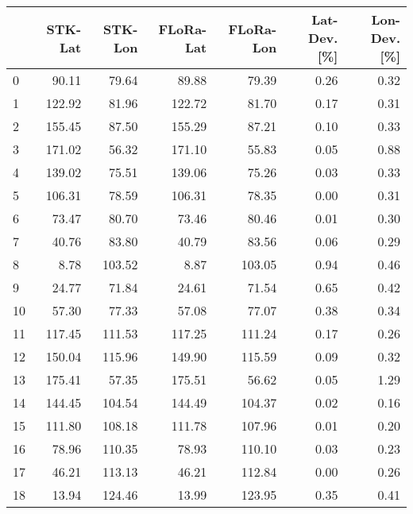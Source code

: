 \begin{tabular}{lrrrrrr}
\toprule
{} &  STK-Lat &  STK-Lon &  FLoRa-Lat &  FLoRa-Lon &  Lat-Dev. [\%] &  Lon-Dev. [\%] \\
\midrule
0  &    90.11 &    79.64 &      89.88 &      79.39 &          0.26 &          0.32 \\
1  &   122.92 &    81.96 &     122.72 &      81.70 &          0.17 &          0.31 \\
2  &   155.45 &    87.50 &     155.29 &      87.21 &          0.10 &          0.33 \\
3  &   171.02 &    56.32 &     171.10 &      55.83 &          0.05 &          0.88 \\
4  &   139.02 &    75.51 &     139.06 &      75.26 &          0.03 &          0.33 \\
5  &   106.31 &    78.59 &     106.31 &      78.35 &          0.00 &          0.31 \\
6  &    73.47 &    80.70 &      73.46 &      80.46 &          0.01 &          0.30 \\
7  &    40.76 &    83.80 &      40.79 &      83.56 &          0.06 &          0.29 \\
8  &     8.78 &   103.52 &       8.87 &     103.05 &          0.94 &          0.46 \\
9  &    24.77 &    71.84 &      24.61 &      71.54 &          0.65 &          0.42 \\
10 &    57.30 &    77.33 &      57.08 &      77.07 &          0.38 &          0.34 \\
11 &   117.45 &   111.53 &     117.25 &     111.24 &          0.17 &          0.26 \\
12 &   150.04 &   115.96 &     149.90 &     115.59 &          0.09 &          0.32 \\
13 &   175.41 &    57.35 &     175.51 &      56.62 &          0.05 &          1.29 \\
14 &   144.45 &   104.54 &     144.49 &     104.37 &          0.02 &          0.16 \\
15 &   111.80 &   108.18 &     111.78 &     107.96 &          0.01 &          0.20 \\
16 &    78.96 &   110.35 &      78.93 &     110.10 &          0.03 &          0.23 \\
17 &    46.21 &   113.13 &      46.21 &     112.84 &          0.00 &          0.26 \\
18 &    13.94 &   124.46 &      13.99 &     123.95 &          0.35 &          0.41 \\

\end{tabular}
